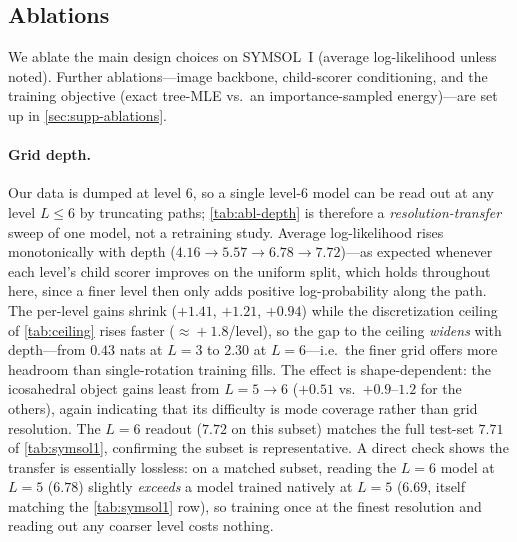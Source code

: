 \subsection{Ablations}
\label{sec:ablations}

We ablate the main design choices on SYMSOL~I (average log-likelihood unless
noted). Further ablations---image backbone, child-scorer conditioning, and the
training objective (exact tree-MLE vs.\ an importance-sampled energy)---are set up
in \cref{sec:supp-ablations}.

\paragraph{Grid depth.}
Our data is dumped at level $6$, so a single level-6 model can be read out at any
level $L\le 6$ by truncating paths; \cref{tab:abl-depth} is therefore a
\emph{resolution-transfer} sweep of one model, not a retraining study. Average
log-likelihood rises monotonically with depth ($4.16\!\to\!5.57\!\to\!6.78\!\to\!
7.72$)---as expected whenever each level's child scorer improves on the uniform
split, which holds throughout here, since a finer level then only adds positive
log-probability along the path. The per-level gains shrink ($+1.41$, $+1.21$, $+0.94$) while the
discretization ceiling of \cref{tab:ceiling} rises faster ($\approx\!+1.8$/level),
so the gap to the ceiling \emph{widens} with depth---from $0.43$ nats at $L{=}3$
to $2.30$ at $L{=}6$---i.e.\ the finer grid offers more headroom than
single-rotation training fills. The effect is shape-dependent: the icosahedral
object gains least from $L{=}5\!\to\!6$ ($+0.51$ vs.\ $+0.9$--$1.2$ for the
others), again indicating that its difficulty is mode coverage rather than grid
resolution. The $L{=}6$ readout ($7.72$ on this subset) matches the full test-set
$7.71$ of \cref{tab:symsol1}, confirming the subset is representative. A direct
check shows the transfer is essentially lossless: on a matched subset, reading the
$L{=}6$ model at $L{=}5$ ($6.78$) slightly \emph{exceeds} a model trained natively
at $L{=}5$ ($6.69$, itself matching the \cref{tab:symsol1} row), so training once
at the finest resolution and reading out any coarser level costs nothing.

